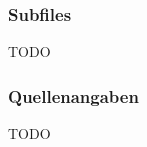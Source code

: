 \documentclass[FIPLY_base.tex]{subfiles}
\begin{document}
\subsubsection{Subfiles}
TODO
\subsubsection{Quellenangaben}
TODO
\end{document}
